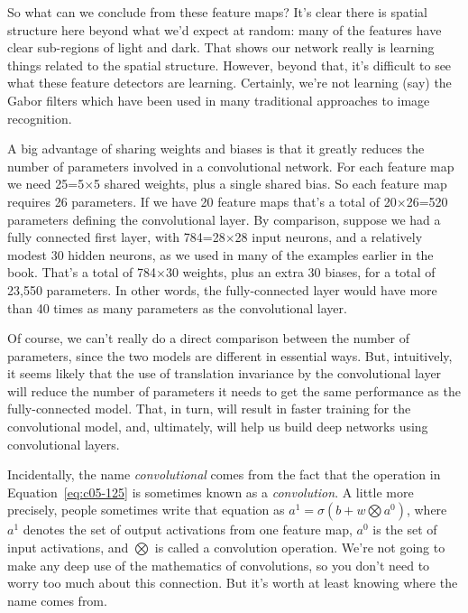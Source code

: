 So what can we conclude from these feature maps? It's clear there is spatial structure here beyond what we'd expect at random: many of the features have clear sub-regions of light and dark. That shows our network really is learning things related to the spatial structure. However, beyond that, it's difficult to see what these feature detectors are learning. Certainly, we're not learning (say) the Gabor filters \cite{wikipediaGabor_filter2019} which have been used in many traditional approaches to image recognition.


A big advantage of sharing weights and biases is that it greatly reduces the number of parameters involved in a convolutional network. For each feature map we need 25=5$\times$5 shared weights, plus a single shared bias. So each feature map requires 26 parameters. If we have 20 feature maps that's a total of 20$\times$26=520 parameters defining the convolutional layer. By comparison, suppose we had a fully connected first layer, with 784=28$\times$28 input neurons, and a relatively modest 30 hidden neurons, as we used in many of the examples earlier in the book. That's a total of 784$\times$30 weights, plus an extra 30 biases, for a total of 23,550 parameters. In other words, the fully-connected layer would have more than 40 times as many parameters as the convolutional layer.

Of course, we can't really do a direct comparison between the number of parameters, since the two models are different in essential ways. But, intuitively, it seems likely that the use of translation invariance by the convolutional layer will reduce the number of parameters it needs to get the same performance as the fully-connected model. That, in turn, will result in faster training for the convolutional model, and, ultimately, will help us build deep networks using convolutional layers.

Incidentally, the name \textit{convolutional} comes from the fact that the operation in Equation~\ref{eq:c05-125} is sometimes known as a \textit{convolution}. A little more precisely, people sometimes write that equation as $a^{1}=\sigma\left(b+w \bigotimes a^{0}\right)$, where $a^1$ denotes the set of output activations from one feature map, $a^0$ is the set of input activations, and $\bigotimes$ is called a convolution operation. We're not going to make any deep use of the mathematics of convolutions, so you don't need to worry too much about this connection. But it's worth at least knowing where the name comes from.

